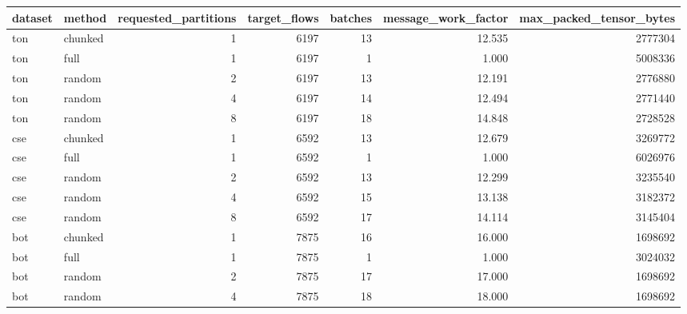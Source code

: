 \begin{tabular}{llrrrrr}
\toprule
dataset & method & requested_partitions & target_flows & batches & message_work_factor & max_packed_tensor_bytes \\
\midrule
ton & chunked & 1 & 6197 & 13 & 12.535 & 2777304 \\
ton & full & 1 & 6197 & 1 & 1.000 & 5008336 \\
ton & random & 2 & 6197 & 13 & 12.191 & 2776880 \\
ton & random & 4 & 6197 & 14 & 12.494 & 2771440 \\
ton & random & 8 & 6197 & 18 & 14.848 & 2728528 \\
cse & chunked & 1 & 6592 & 13 & 12.679 & 3269772 \\
cse & full & 1 & 6592 & 1 & 1.000 & 6026976 \\
cse & random & 2 & 6592 & 13 & 12.299 & 3235540 \\
cse & random & 4 & 6592 & 15 & 13.138 & 3182372 \\
cse & random & 8 & 6592 & 17 & 14.114 & 3145404 \\
bot & chunked & 1 & 7875 & 16 & 16.000 & 1698692 \\
bot & full & 1 & 7875 & 1 & 1.000 & 3024032 \\
bot & random & 2 & 7875 & 17 & 17.000 & 1698692 \\
bot & random & 4 & 7875 & 18 & 18.000 & 1698692 \\
\bottomrule
\end{tabular}
